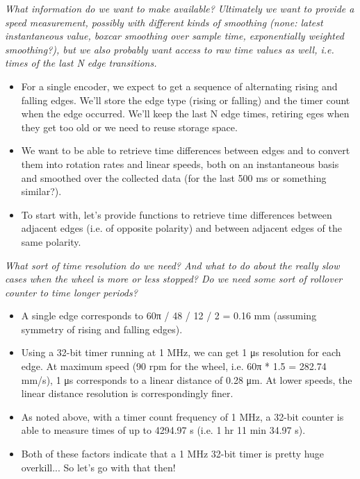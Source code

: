 \documentclass[a4paper,11pt]{article}
\begin{document}
\textit{What information do we want to make available? Ultimately we
  want to provide a speed measurement, possibly with different kinds
  of smoothing (none: latest instantaneous value, boxcar smoothing
  over sample time, exponentially weighted smoothing?), but we also
  probably want access to raw time values as well, i.e. times of the
  last N edge transitions.}

\begin{itemize}
  \item{For a single encoder, we expect to get a sequence of
    alternating rising and falling edges. We'll store the edge type
    (rising or falling) and the timer count when the edge occurred.
    We'll keep the last N edge times, retiring eges when they get too
    old or we need to reuse storage space.}
  \item{We want to be able to retrieve time differences between edges
    and to convert them into rotation rates and linear speeds, both on
    an instantaneous basis and smoothed over the collected data (for
    the last 500 ms or something similar?).}
  \item{To start with, let's provide functions to retrieve time
    differences between adjacent edges (i.e. of opposite polarity) and
    between adjacent edges of the same polarity.}
\end{itemize}

\textit{What sort of time resolution do we need? And what to do about
  the really slow cases when the wheel is more or less stopped? Do we
  need some sort of rollover counter to time longer periods?}

\begin{itemize}
  \item{A single edge corresponds to 60π / 48 / 12 / 2 = 0.16 mm
    (assuming symmetry of rising and falling edges).}
  \item{Using a 32-bit timer running at 1 MHz, we can get 1 μs
    resolution for each edge. At maximum speed (90 rpm for the wheel,
    i.e. 60π * 1.5 = 282.74 mm/s), 1 μs corresponds to a linear
    distance of 0.28 μm. At lower speeds, the linear distance
    resolution is correspondingly finer.}
  \item{As noted above, with a timer count frequency of 1 MHz, a
    32-bit counter is able to measure times of up to 4294.97 s (i.e. 1
    hr 11 min 34.97 s).}
  \item{Both of these factors indicate that a 1 MHz 32-bit timer is
    pretty huge overkill... So let's go with that then!}
\end{itemize}
\end{document}
